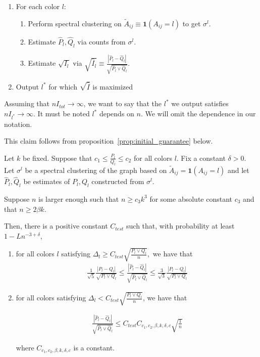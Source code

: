 \documentclass{article}
\begin{document}
\begin{enumerate}
\item For each color $l$:
  \begin{enumerate}
   \item Perform spectral clustering on $\tilde{A}_{ij} \equiv \mathbf{1}(A_{ij} = l)$ to get $\sigma^l$. 
   \item Estimate $\hat{P}_l, \hat{Q}_l$ via counts from $\sigma^l$. 
   \item Estimate $\sqrt{I_l}$ via 
  $\sqrt{ \hat{I}_l } \equiv \frac{|\hat{P}_l - \hat{Q}_l|}{\sqrt{ \hat{P}_l \vee \hat{Q}_l}}$. 
   \end{enumerate}
\item Output $l^*$ for which $\sqrt{\hat{I}}$ is maximized
\end{enumerate}

Assuming that $ n I_{tot} \rightarrow \infty$, we want to say that the $l^*$ we output satisfies $n I_{l^*} \rightarrow \infty $. It must be noted $l^*$ depends on $n$. We will omit the dependence in our notation. 

This claim follows from proposition~\ref{prop:initial_guarantee} below. 

\begin{proposition}
\label{prop:initial_guarantee}
Let $k$ be fixed. Suppose that $c_1 \leq \frac{P_l}{Q_l} \leq c_2$ for all colors $l$. Fix a constant $\delta > 0$. Let $\sigma^l$ be a spectral clustering of the graph based on $\tilde{A}_{ij} = \mathbf{1}(A_{ij} = l)$ and let $\hat{P}_l, \hat{Q}_l$ be estimates of $P_l, Q_l$ constructed from $\sigma^l$.


Suppose $n$ is larger enough such that $n \geq c_3 k^3$ for some absolute constant $c_3$ and that $n \geq 2 \beta k$. 

Then, there is a positive constant $C_{test}$ such that, with probability at least $1 - Ln^{-3 + \delta}$,

\begin{enumerate} 
\item for all colors $l$ satisfying $\Delta_l \geq C_{test} \sqrt{ \frac{P_l \vee Q_l}{n}}, $  we have that
\begin{align}
\frac{1}{\sqrt{5}} \frac{ | P_l - Q_l |}{\sqrt{P_l \vee Q_l}}  \leq \frac{ | \hat{P}_l - \hat{Q}_l| }{\sqrt{ \hat{P}_l \vee \hat{Q}_l }} \leq  
\frac{3}{\sqrt{3}} \frac{ | P_l - Q_l | }{\sqrt{ P_l \vee Q_l}} 
\end{align}

\item for all colors satisfying $\Delta_l < C_{test} \sqrt{ \frac{P_l \vee Q_l}{n} }$, we have that

\begin{align}
\frac{ | \hat{P}_l - \hat{Q}_l|}{\sqrt{ \hat{P}_l \vee \hat{Q}_l}} \leq C_{test} C_{c_1, c_2, \beta, k, \delta, c} \sqrt{ \frac{1}{n} } 
\label{eqn:bad_l_initialization}
\end{align}

where $C_{c_1, c_2, \beta, k, \delta, c}$ is a constant. 

\end{enumerate}

\end{proposition}
\end{document}
